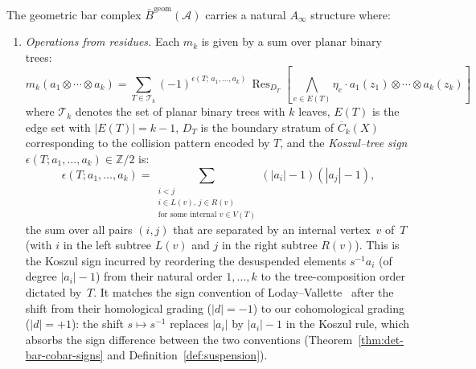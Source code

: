 \begin{theorem}\label{thm:bar-ainfty-complete}
The geometric bar complex $\bar{B}^{\text{geom}}(\mathcal{A})$ carries a natural $A_\infty$ structure where:

\begin{enumerate}
\item \emph{Operations from residues.} Each $m_k$ is given by a sum over planar binary trees:
\begin{equation}\label{eq:mk-tree-sum}
m_k(a_1 \otimes \cdots \otimes a_k) = \sum_{T \in \mathcal{T}_k}
(-1)^{\epsilon(T;\,a_1,\ldots,a_k)}\,
\operatorname{Res}_{D_T}\!\left[\bigwedge_{e \in E(T)} \eta_e
\cdot a_1(z_1) \otimes \cdots \otimes a_k(z_k)\right]
\end{equation}
where $\mathcal{T}_k$ denotes the set of planar binary trees with
$k$ leaves, $E(T)$ is the edge set with $|E(T)| = k-1$, $D_T$ is
the boundary stratum of $\overline{C}_k(X)$ corresponding to the
collision pattern encoded by $T$, and the \emph{Koszul--tree sign}
$\epsilon(T; a_1, \ldots, a_k) \in \mathbb{Z}/2$ is:
\begin{equation}\label{eq:koszul-tree-sign}
\epsilon(T; a_1, \ldots, a_k)
= \sum_{\substack{i < j \\ i \in L(v),\, j \in R(v) \\
 \text{for some internal } v \in V(T)}}
(|a_i| - 1)(|a_j| - 1),
\end{equation}
the sum over all pairs $(i,j)$ that are separated by an internal
vertex~$v$ of~$T$ (with $i$ in the left subtree $L(v)$ and $j$ in
the right subtree $R(v)$). This is the Koszul sign incurred by
reordering the desuspended elements $s^{-1}a_i$ (of degree
$|a_i| - 1$) from their natural order $1, \ldots, k$ to the
tree-composition order dictated by~$T$. It matches the sign
convention of Loday--Vallette~\cite[\S10.3.3]{LV12} after the
shift from their homological grading ($|d| = -1$) to our
cohomological grading ($|d| = +1$): the shift $s \mapsto s^{-1}$
replaces $|a_i|$ by $|a_i| - 1$ in the Koszul rule, which absorbs
the sign difference between the two conventions
\textup{(}Theorem~\textup{\ref{thm:det-bar-cobar-signs}} and
Definition~\textup{\ref{def:suspension}}\textup{)}.


\end{enumerate}
\end{theorem}
